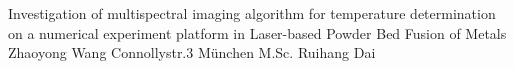 \documentclass[IWBstudentthesis%
              ,optCharter%
              ,optBibtex%
              ,optBibstyleNumeric   %
              ,optEnglish%
              ,optCenterEquations%
              ]{IWBlatex}%
\begin{document}
%
\frontmatter%
%
% 
{Investigation of multispectral imaging algorithm for temperature
determination on a numerical experiment platform in Laser-based 
Powder Bed Fusion of Metals}
{Zhaoyong Wang \newline Connollystr.3  München}
{\IWBnamesProfWudy \newline M.Sc. Ruihang Dai \newline \IWBlangChairMWLBAM}
{}%
%
%
%
%
%
\end{document}
